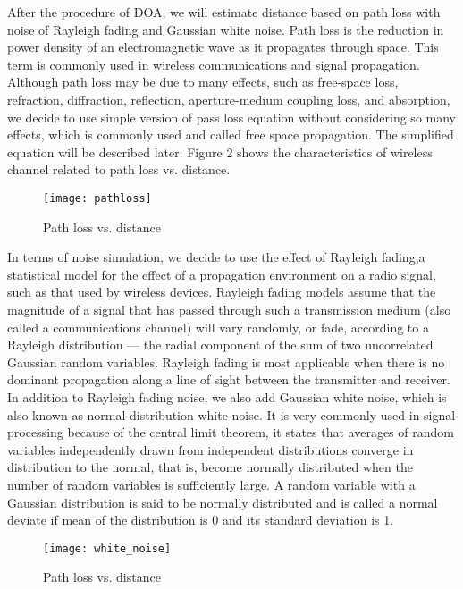 \par
	After the procedure of DOA, we will estimate distance based on path loss with noise of Rayleigh fading and Gaussian white noise. Path loss is the reduction in power density of an electromagnetic wave as it propagates through space. This term is commonly used in wireless communications and signal propagation. Although path loss may be due to many effects, such as free-space loss, refraction, diffraction, reflection, aperture-medium coupling loss, and absorption, we decide to use simple version of pass loss equation without considering so many effects, which is commonly used and called free space propagation. The simplified equation will be described later. Figure 2 shows the characteristics of wireless channel related to path loss vs. distance. \cite{elsayed} \cite{wiki:Pathloss} 
	\begin{figure}[ht]
	\centering
	\texttt{[image: pathloss]}
	\caption{Path loss vs. distance}
	\end{figure}
\par
	In terms of noise simulation, we decide to use the effect of Rayleigh fading,a statistical model for the effect of a propagation environment on a radio signal, such as that used by wireless devices. Rayleigh fading models assume that the magnitude of a signal that has passed through such a transmission medium (also called a communications channel) will vary randomly, or fade, according to a Rayleigh distribution — the radial component of the sum of two uncorrelated Gaussian random variables. Rayleigh fading is most applicable when there is no dominant propagation along a line of sight between the transmitter and receiver. In addition to Rayleigh fading noise, we also add Gaussian white noise, which is also known as normal distribution white noise. It is very commonly used in signal processing because of the central limit theorem, it states that averages of random variables independently drawn from independent distributions converge in distribution to the normal, that is, become normally distributed when the number of random variables is sufficiently large.  A random variable with a Gaussian distribution is said to be normally distributed and is called a normal deviate if mean of the distribution is 0 and its standard deviation is 1. \cite{wiki:Rayleighfading} \cite{wiki:Normaldistribution} \cite{white_noise}
	\begin{figure}[ht]
	\centering
	\texttt{[image: white\_noise]}
	\caption{Path loss vs. distance}
	\end{figure}


